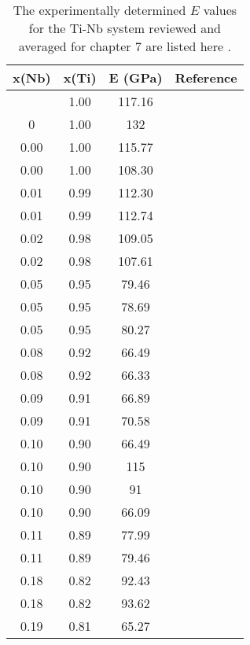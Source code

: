 
\noindent 
\begin{longtable}[H]{ c c c c }
	\caption{The experimentally determined $E$ values for the Ti-Nb system reviewed and averaged for chapter 7 are listed here \cite{Friak2012,Karre2015,Ozaki2004,Timoshevskii2011}.} \label{af-table:tinbelasticexpt}\\
	\hline
	x(Nb) & x(Ti) & E (GPa) & Reference \\
	\hline
	\endhead
	\hline
	\endfoot
	 0.00 & 1.00 & 117.16 & \cite{Timoshevskii2011}\\
	 0 & 1.00 & 132 & \cite{Friak2012}\\
	 0.00 & 1.00 & 115.77 & \cite{Ozaki2004}\\
	 0.00 & 1.00 & 108.30 & \cite{Karre2015}\\
	 0.01 & 0.99 & 112.30 & \cite{Timoshevskii2011}\\
	 0.01 & 0.99 & 112.74 & \cite{Ozaki2004}\\
	 0.02 & 0.98 & 109.05 & \cite{Timoshevskii2011}\\
	 0.02 & 0.98 & 107.61 & \cite{Ozaki2004}\\
	 0.05 & 0.95 & 79.46 & \cite{Timoshevskii2011}\\
	 0.05 & 0.95 & 78.69 & \cite{Ozaki2004}\\
	 0.05 & 0.95 & 80.27 & \cite{Timoshevskii2011}\\
	 0.08 & 0.92 & 66.49 & \cite{Timoshevskii2011}\\
	 0.08 & 0.92 & 66.33 & \cite{Ozaki2004}\\
	 0.09 & 0.91 & 66.89 & \cite{Timoshevskii2011}\\
	 0.09 & 0.91 & 70.58 & \cite{Karre2015}\\
	 0.10 & 0.90 & 66.49 & \cite{Timoshevskii2011}\\
	 0.10 & 0.90 & 115 & \cite{Friak2012}\\
	 0.10 & 0.90 & 91 & \cite{Friak2012}\\
	 0.10 & 0.90 & 66.09 & \cite{Ozaki2004}\\
	 0.11 & 0.89 & 77.99 & \cite{Ozaki2004}\\
	 0.11 & 0.89 & 79.46 & \cite{Timoshevskii2011}\\
	 0.18 & 0.82 & 92.43 & \cite{Timoshevskii2011}\\
	 0.18 & 0.82 & 93.62 & \cite{Ozaki2004}\\
	 0.19 & 0.81 & 65.27 & \cite{Timoshevskii2011}\\

\end{longtable}
